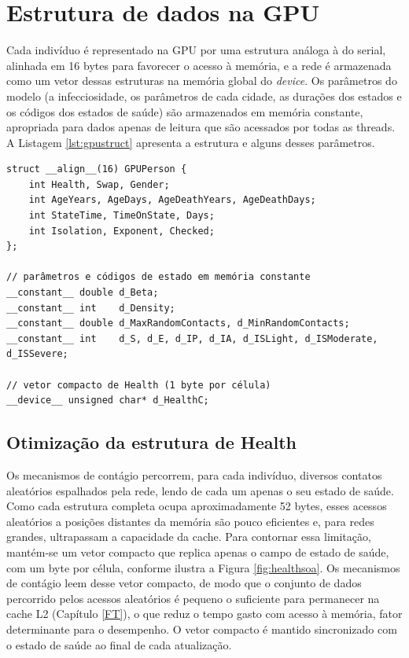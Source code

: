 \section{Estrutura de dados na GPU}

Cada indivíduo é representado na GPU por uma estrutura análoga à do serial, alinhada em 16 bytes para favorecer o acesso à memória, e a rede é armazenada como um vetor dessas estruturas na memória global do \textit{device}. Os parâmetros do modelo (a infecciosidade, os parâmetros de cada cidade, as durações dos estados e os códigos dos estados de saúde) são armazenados em memória constante, apropriada para dados apenas de leitura que são acessados por todas as threads. A Listagem \ref{lst:gpustruct} apresenta a estrutura e alguns desses parâmetros.

\begin{lstlisting}[caption={Estrutura do indivíduo e parâmetros em memória constante.}, label={lst:gpustruct}]
struct __align__(16) GPUPerson {
    int Health, Swap, Gender;
    int AgeYears, AgeDays, AgeDeathYears, AgeDeathDays;
    int StateTime, TimeOnState, Days;
    int Isolation, Exponent, Checked;
};

// parâmetros e códigos de estado em memória constante
__constant__ double d_Beta;
__constant__ int    d_Density;
__constant__ double d_MaxRandomContacts, d_MinRandomContacts;
__constant__ int    d_S, d_E, d_IP, d_IA, d_ISLight, d_ISModerate, d_ISSevere;

// vetor compacto de Health (1 byte por célula)
__device__ unsigned char* d_HealthC;
\end{lstlisting}

\subsection{Otimização da estrutura de Health}

Os mecanismos de contágio percorrem, para cada indivíduo, diversos contatos aleatórios espalhados pela rede, lendo de cada um apenas o seu estado de saúde. Como cada estrutura completa ocupa aproximadamente 52 bytes, esses acessos aleatórios a posições distantes da memória são pouco eficientes e, para redes grandes, ultrapassam a capacidade da cache. Para contornar essa limitação, mantém-se um vetor compacto que replica apenas o campo de estado de saúde, com um byte por célula, conforme ilustra a Figura \ref{fig:healthsoa}. Os mecanismos de contágio leem desse vetor compacto, de modo que o conjunto de dados percorrido pelos acessos aleatórios é pequeno o suficiente para permanecer na cache L2 (Capítulo \ref{FT}), o que reduz o tempo gasto com acesso à memória, fator determinante para o desempenho. O vetor compacto é mantido sincronizado com o estado de saúde ao final de cada atualização.

